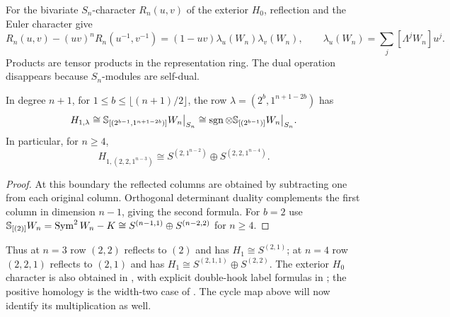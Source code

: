 For the bivariate $S_n$-character $R_n(u,v)$ of the exterior $H_0$,
reflection and the Euler character give
\[
 R_n(u,v)-(uv)^nR_n(u^{-1},v^{-1})
    =(1-uv)\lambda_u(W_n)\lambda_v(W_n),
 \qquad
 \lambda_u(W_n)=\sum_j[\Lambda^jW_n]u^j.
\]
Products are tensor products in the representation ring. The dual
operation disappears because $S_n$-modules are self-dual.

\begin{corollary}
\label{cor:two-column-first-syzygies}
In degree $n+1$, for $1\le b\le\lfloor(n+1)/2\rfloor$, the row
$\lambda=(2^b,1^{n+1-2b})$ has
\[
 H_{1,\lambda}
 \cong\mathbb S_{[(2^{b-1},1^{n+1-2b})]}W_n\big|_{S_n}
 \cong\operatorname{sgn}\otimes\mathbb S_{[(2^{b-1})]}W_n\big|_{S_n}.
\]
In particular, for $n\ge4$,
\[
 H_{1,(2,2,1^{n-3})}
   \cong S^{(2,1^{n-2})}\oplus S^{(2,2,1^{n-4})}.
\]
\end{corollary}
\begin{proof}
At this boundary the reflected columns are obtained by subtracting
one from each original column. Orthogonal determinant duality
complements the first column in dimension $n-1$, giving the second
formula. For $b=2$ use
$\mathbb S_{[(2)]}W_n=\operatorname{Sym}^2W_n-K
 \cong S^{(n-1,1)}\oplus S^{(n-2,2)}$ for $n\ge4$.
\end{proof}

Thus at $n=3$ row $(2,2)$ reflects to $(2)$ and has
$H_1\cong S^{(2,1)}$; at $n=4$ row $(2,2,1)$ reflects to $(2,1)$
and has $H_1\cong S^{(2,1,1)}\oplus S^{(2,2)}$.
The exterior $H_0$ character is also obtained in
\cite{KimRhoades,Lentfer}, with explicit double-hook label formulas
in \cite{LentferSign}; the positive homology is the width-two case
of \cite[Theorem~4.4]{SSW2013}. The cycle map above will now identify
its multiplication as well.

